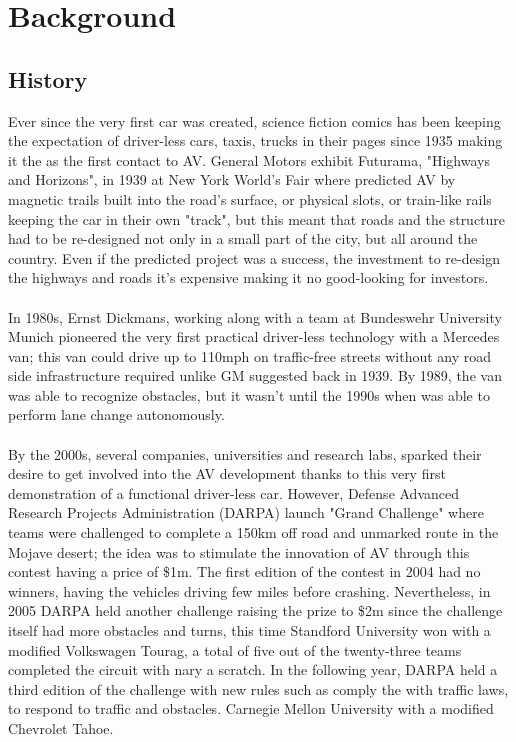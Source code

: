\section{Background}
    \subsection{History}
    Ever since the very first car was created, science fiction comics has been keeping the expectation of driver-less cars, taxis, trucks in their pages since 1935 making it the as the first contact to AV. General Motors exhibit Futurama, "Highways and Horizons", in 1939 at New York World's Fair where predicted AV by magnetic trails built into the road's surface, or physical slots, or train-like rails keeping the car in their own "track", but this meant that roads and the structure had to be re-designed not only in a small part of the city, but all around the country. Even if the predicted project was a success, the investment to re-design the highways and roads it's expensive making it no good-looking for investors.\\
    \\In 1980s, Ernst Dickmans, working along with a team at Bundeswehr University Munich pioneered the very first practical driver-less technology with a Mercedes van; this van could drive up to 110mph  on traffic-free streets without any road side infrastructure required unlike GM suggested back in 1939. By 1989, the van was able to recognize obstacles, but it wasn't until the 1990s when was able to perform lane change autonomously.\\
    \\By the 2000s, several companies, universities and research labs, sparked their desire to get involved into the AV development thanks to this very first demonstration of a functional driver-less car. However, Defense  Advanced  Research  Projects  Administration  (DARPA) launch "Grand Challenge" where teams were challenged to complete a 150km off road and unmarked route in the Mojave desert; the idea was to stimulate the innovation of AV through this contest having a price of \$1m. The first edition of the contest in 2004 had no winners, having the vehicles driving few miles before crashing. Nevertheless, in 2005 DARPA held another challenge raising the prize to \$2m since the challenge itself had more obstacles and turns, this time Standford University won with a modified Volkswagen Tourag, a total of five out of the twenty-three teams completed the circuit with nary a scratch. In the following year, DARPA held a third edition of the challenge with new rules such as comply the with traffic laws, to respond to traffic and obstacles. Carnegie Mellon University with a modified Chevrolet Tahoe\cite{DARPA}.
    
